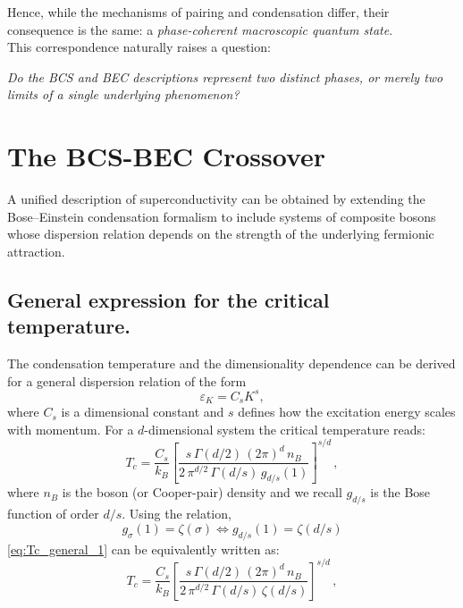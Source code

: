 Hence, while the mechanisms of pairing and condensation differ, their consequence is the same: a \textit{phase-coherent macroscopic quantum state}.  \\
This correspondence naturally raises a question:
\begin{center}
\textit{Do the BCS and BEC descriptions represent two distinct phases, or merely two limits of a single underlying phenomenon?}
\end{center}

\section{The BCS-BEC Crossover}

A unified description of superconductivity can be obtained by extending the Bose--Einstein condensation formalism to include systems of composite bosons whose dispersion relation depends on the strength of the underlying fermionic attraction. 

\subsection*{General expression for the critical temperature.}
The condensation temperature and the dimensionality dependence can be derived for a general dispersion relation of the form
\[
    \varepsilon_K = C_s K^s,
\]
where \(C_s\) is a dimensional constant and \(s\) defines how the excitation energy scales with momentum. For a $d$-dimensional system the critical temperature reads:
\begin{equation}
\boxed{
    T_c = \frac{C_s}{k_B}
    \left[
        \frac{s\, \Gamma(d/2)\, (2\pi)^d\, n_B}
             {2\, \pi^{d/2}\, \Gamma(d/s)\, g_{d/s}(1)}
    \right]^{s/d}}\, ,
    \label{eq:Tc_general_1}
\end{equation}
where \(n_B\) is the boson (or Cooper-pair) density and we recall $g_{d/s}$ is the Bose function of order $d/s$. Using the relation,
\[
g_{\sigma}(1) = \zeta(\sigma) \iff g_{d/s}(1) = \zeta(d/s) 
\]
\eqref{eq:Tc_general_1} can be equivalently written as:
\begin{equation}
\boxed{
    T_c = \frac{C_s}{k_B}
    \left[
        \frac{s\, \Gamma(d/2)\, (2\pi)^d\, n_B}
             {2\, \pi^{d/2}\, \Gamma(d/s)\, \zeta(d/s)}
    \right]^{s/d}}\, ,
    \label{eq:Tc_general_2}
\end{equation}

